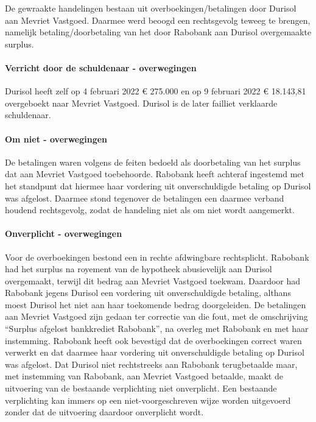 \documentclass[
  dutch,
  a4paper,
]{article}
\begin{document}
De gewraakte handelingen bestaan uit overboekingen/betalingen door Durisol aan Mevriet Vastgoed. Daarmee werd beoogd een rechtsgevolg teweeg te brengen, namelijk betaling/doorbetaling van het door Rabobank aan Durisol overgemaakte surplus.

\paragraph{Verricht door de schuldenaar - overwegingen}\label{verricht-door-de-schuldenaar---overwegingen-10}

Durisol heeft zelf op 4 februari 2022 € 275.000 en op 9 februari 2022 € 18.143,81 overgeboekt naar Mevriet Vastgoed. Durisol is de later failliet verklaarde schuldenaar.

\paragraph{Om niet - overwegingen}\label{om-niet---overwegingen-10}

De betalingen waren volgens de feiten bedoeld als doorbetaling van het surplus dat aan Mevriet Vastgoed toebehoorde. Rabobank heeft achteraf ingestemd met het standpunt dat hiermee haar vordering uit onverschuldigde betaling op Durisol was afgelost. Daarmee stond tegenover de betalingen een daarmee verband houdend rechtsgevolg, zodat de handeling niet als om niet wordt aangemerkt.

\paragraph{Onverplicht - overwegingen}\label{onverplicht---overwegingen-10}

Voor de overboekingen bestond een in rechte afdwingbare rechtsplicht. Rabobank had het surplus na royement van de hypotheek abusievelijk aan Durisol overgemaakt, terwijl dit bedrag aan Mevriet Vastgoed toekwam. Daardoor had Rabobank jegens Durisol een vordering uit onverschuldigde betaling, althans moest Durisol het niet aan haar toekomende bedrag doorgeleiden. De betalingen aan Mevriet Vastgoed zijn gedaan ter correctie van die fout, met de omschrijving ``Surplus afgelost bankkrediet Rabobank'', na overleg met Rabobank en met haar instemming. Rabobank heeft ook bevestigd dat de overboekingen correct waren verwerkt en dat daarmee haar vordering uit onverschuldigde betaling op Durisol was afgelost. Dat Durisol niet rechtstreeks aan Rabobank terugbetaalde maar, met instemming van Rabobank, aan Mevriet Vastgoed betaalde, maakt de uitvoering van de bestaande verplichting niet onverplicht. Een bestaande verplichting kan immers op een niet-voorgeschreven wijze worden uitgevoerd zonder dat de uitvoering daardoor onverplicht wordt.
\end{document}
